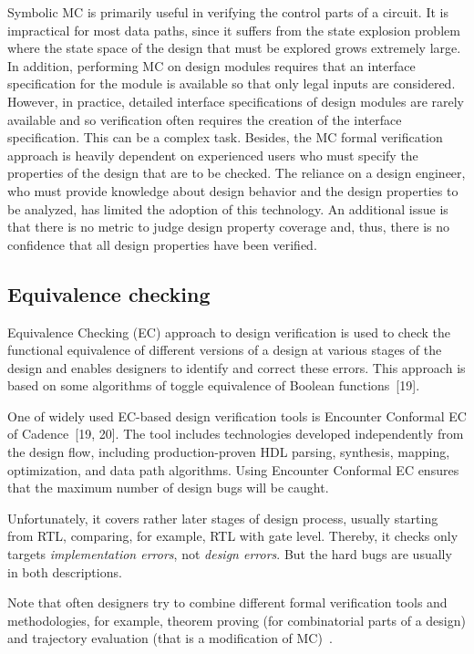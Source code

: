 \begin{multicols}{2}
    Symbolic MC is primarily useful in verifying the control parts of a circuit. It is impractical for
most data paths, since it suffers from the state explosion problem where the state space of the design that must
be explored grows extremely large. In addition, performing MC on design modules requires that an
interface specification for the module is available so that only legal inputs are considered. However, in practice,
detailed interface specifications of design modules are rarely available and so verification often requires the
creation of the interface specification. This can be a complex task.
Besides, the MC formal
verification approach is heavily dependent on experienced users who must specify the properties of the design
that are to be checked. The reliance on a design engineer, who must provide knowledge about design behavior
and the design properties to be analyzed, has limited the adoption of this technology. An additional issue is that
there is no metric to judge design property coverage and, thus, there is no confidence that all design properties
have been verified.

\subsection{Equivalence checking} %

\noindent
 Equivalence Checking (EC)
approach to design verification is used to check the functional equivalence of
different versions of a design at various stages of the design and enables designers to identify and correct these
errors. This approach is based on some algorithms of toggle equivalence of Boolean functions~[19].

   One of widely used EC-based design verification tools is Encounter Conformal EC of
Cadence~[19, 20]. The tool includes technologies developed independently from the design flow,
including production-proven HDL parsing, synthesis, mapping, optimization, and data path algorithms. Using
Encounter Conformal EC ensures that the maximum number of design bugs will be caught.

   Unfortunately, it covers rather later stages of design process, usually starting from RTL, comparing, for
example, RTL with gate level. Thereby, it checks only targets \textit{implementation errors}, not \textit{design
errors}. But the hard bugs are usually in both descriptions.

   Note that often designers try to combine different formal verification tools and methodologies, for example,
theorem proving (for combinatorial parts of a design) and trajectory evaluation (that is a modification
of MC)~\cite{9bar}.


\end{multicols}
